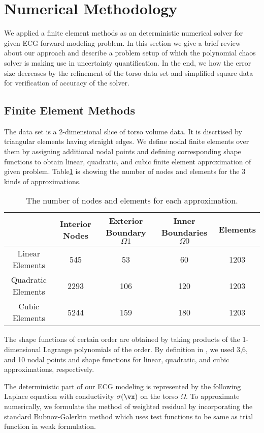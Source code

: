 \section{Numerical Methodology}

We applied a finite element methods as an deterministic numerical
solver for given ECG forward modeling problem. In this section we
give a brief review about our approach and describe a problem
setup of which the polynomial chaos solver is making use in
uncertainty quantification. In the end, we how the error size
decreases by the refinement of the torso data set and simplified
square data for verification of accuracy of the solver.

\subsection{Finite Element Methods}

The data set is a 2-dimensional slice of torso volume data. It is
discrtised by triangular elements having straight edges. We define
nodal finite elements over them by assigning additional nodal
points and defining corresponding shape functions to obtain
linear, quadratic, and cubic finite element approximation of given
problem. Table\ref{torsospec} is showing the number of nodes and
elements for the 3 kinds of approximations.

\begin{table}
\centering \caption {\label{torsospec} The number of nodes and
elements for each approximation.}
\begin{tabular}{|c||c|c|c|c|} \hline
    &Interior Nodes & Exterior Boundary $\Omega{1}$ & Inner Boundaries $\Omega{0}$& Elements \\ \hline
    Linear Elements     &545    &   53 & 60 &1203 \\ \hline
    Quadratic Elements&2293 &   106 & 120 &1203 \\ \hline
    Cubic Elements&5244 &159 & 180 &1203    \\ \hline
\end{tabular}
\end{table}



The shape functions of certain order are obtained by taking
products of the 1-dimensional Lagrange polynomials of the order.
By definition in \cite{Hughes}, we used 3,6, and 10 nodal points
and shape functions for linear, quadratic, and cubic
approximations, respectively.

The deterministic part of our ECG modeling is represented by the
following Laplace equation with conductivity $\sigma(\vx)$ on the
torso $\Omega$. To approximate numerically, we formulate the
method of weighted residual by incorporating the standard
Bubnov-Galerkin method \cite{Karniadarkis} which uses test
functions to be same as trial function in weak formulation.

